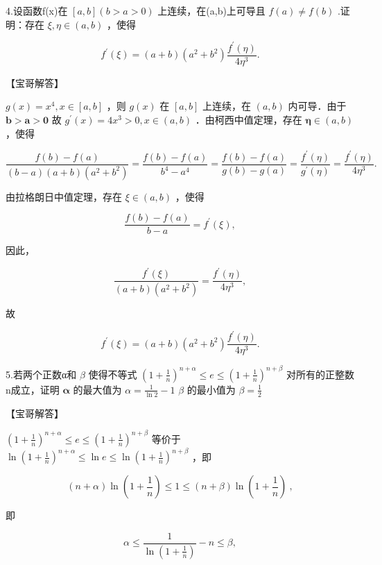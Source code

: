 \documentclass[11pt,fontset=fandol]{ctexart}
\begin{document}
4.设函数f(x)在 \(\left[ a , b \right] \left( b > a > 0 \right)\)
上连续，在(a,b)上可导且 \(f ( a ) \neq f ( b )\) .证明：存在
\(\xi , \eta \in ( a , b )\) ，使得

\[
f ^ { \prime } ( \xi ) = ( a + b ) ( a ^ { 2 } + b ^ { 2 } ) \frac { f ^ { \prime } ( \eta ) } { 4 \eta ^ { 3 } } .
\]

【宝哥解答】

\(g ( x ) = x ^ { 4 } , x \in [ a , b ]\) ，则 \(g ( x )\) 在
\([ a , b ]\) 上连续，在 \(( a , b )\) 内可导．由于
\({ \pmb b } > { \pmb a } > { \pmb 0 }\) 故
\(g ^ { \prime } ( x ) = 4 x ^ { 3 } > 0 , x \in ( a , b )\)
．由柯西中值定理，存在 \(\pmb { \eta } \in ( a , b )\) ，使得

\[
\frac { f ( b ) - f ( a ) } { ( b - a ) ( a + b ) ( a ^ { 2 } + b ^ { 2 } ) } = \frac { f ( b ) - f ( a ) } { b ^ { 4 } - a ^ { 4 } } = \frac { f ( b ) - f ( a ) } { g ( b ) - g ( a ) } = \frac { f ^ { \prime } ( \eta ) } { g ^ { \prime } ( \eta ) } = \frac { f ^ { \prime } ( \eta ) } { 4 \eta ^ { 3 } } .
\]

由拉格朗日中值定理，存在 \(\xi \in ( a , b )\) ，使得

\[
{ \frac { f ( b ) - f ( a ) } { b - a } } = f ^ { \prime } ( \xi ) ,
\]

因此，

\[
{ \frac { f ^ { \prime } ( \xi ) } { ( a + b ) ( a ^ { 2 } + b ^ { 2 } ) } } = { \frac { f ^ { \prime } ( \eta ) } { 4 \eta ^ { 3 } } } ,
\]

故

\[
f ^ { \prime } ( \xi ) = ( a + b ) ( a ^ { 2 } + b ^ { 2 } ) \frac { f ^ { \prime } ( \eta ) } { 4 \eta ^ { 3 } } .
\]

5.若两个正数α和 \(\beta\) 使得不等式
\(( 1 + \frac { 1 } { n } ) ^ { n + \alpha } \leq e \leq ( 1 + \frac { 1 } { n } ) ^ { n + \beta }\)
对所有的正整数n成立，证明 \(\pmb { \alpha }\) 的最大值为
\(\alpha = \frac { 1 } { \ln 2 } - 1\) \(\beta\) 的最小值为
\(\beta = \frac { 1 } { 2 }\)

【宝哥解答】

\(( 1 + \frac { 1 } { n } ) ^ { n + \alpha } \leq e \leq ( 1 + \frac { 1 } { n } ) ^ { n + \beta }\)
等价于
\(\ln ( 1 + \frac { 1 } { n } ) ^ { n + \alpha } \leq \ln e \leq \ln ( 1 + \frac { 1 } { n } ) ^ { n + \beta }\)
，即

\[
( n + \alpha ) \ln ( 1 + \frac { 1 } { n } ) \leq 1 \leq ( n + \beta ) \ln ( 1 + \frac { 1 } { n } ) \ ,
\]

即

\[
\alpha \leq \frac { 1 } { \ln ( 1 + \frac { 1 } { n } ) } - n \leq \beta ,
\]
\end{document}

